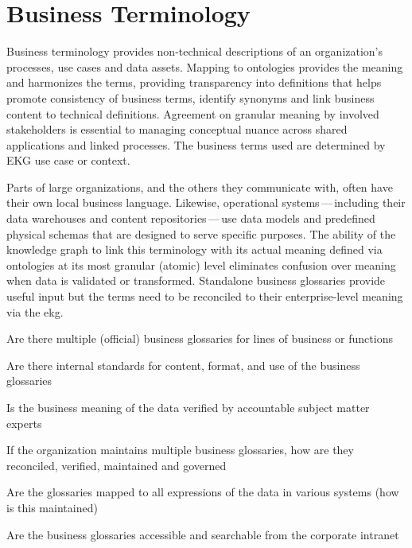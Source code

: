 \section{Business Terminology}%
\label{sec:ekgmm-b-2-4}
\label{sec:ekg-mm-business-terminology}
\label{sec:ekg-mm-business-glossary}

Business terminology provides non-technical descriptions of an organization’s processes, use cases and data assets.
Mapping to ontologies provides the meaning and harmonizes the terms,
providing transparency into definitions that helps promote consistency of business terms,
identify synonyms and link business content to technical definitions.
Agreement on granular meaning by involved stakeholders is essential to managing conceptual nuance across
shared applications and linked processes.
The business terms used are determined by EKG use case or context.

\ekgmmContextSection

Parts of large organizations, and the others they communicate with, often have their own local business language.
Likewise, operational systems\,---\,including their data warehouses and content repositories\,---\,use
data models and predefined physical schemas that are designed to serve specific purposes.
The ability of the knowledge graph to link this terminology with its actual meaning defined via ontologies at
its most granular (atomic) level eliminates confusion over meaning when data is validated or transformed.
Standalone business glossaries provide useful input but the terms need to be reconciled to their
enterprise-level meaning via the \gls{ekg}.

\kgmmcorequestionssection

\begin{core-questions}

  \item [\thesection.1] Are there multiple (official) business glossaries for lines of business or functions
  \item [\thesection.2] Are there internal standards for content, format, and use of the business glossaries
  \item [\thesection.3] Is the business meaning of the data verified by accountable subject matter experts
  \item [\thesection.4] If the organization maintains multiple business glossaries, how are they reconciled,
                        verified, maintained and governed
  \item [\thesection.5] Are the glossaries mapped to all expressions of the data in various systems
                        (how is this maintained)
  \item [\thesection.4] Are the business glossaries accessible and searchable from the corporate intranet

\end{core-questions}

